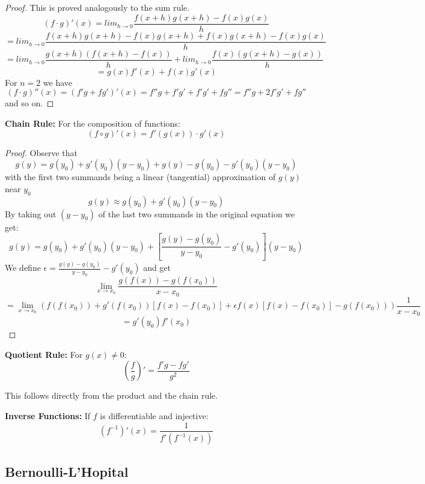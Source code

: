 \begin{proof}
    This is proved analogously to the sum rule.
    $$(f \cdot g)'(x) = lim_{h \to 0} \frac{f(x+h)g(x+h)-f(x)g(x)}{h}$$
    $$ = lim_{h \to 0} \frac{f(x+h)g(x+h)-f(x)g(x+h)+f(x)g(x+h)-f(x)g(x)}{h}$$
    $$ = lim_{h \to 0} \frac{g(x+h)(f(x+h)-f(x))}{h} + lim_{h \to 0} \frac{f(x)(g(x+h)-g(x))}{h}$$
    $$ = g(x)f'(x) + f(x)g'(x)$$
    For $n=2$ we have
    $$(f \cdot g)''(x) = (f'g+fg')'(x) = f''g+f'g'+f'g'+fg'' = f''g+2f'g'+fg''$$
    and so on.
\end{proof}

\begin{theorem}
    \textbf{Chain Rule:} For the composition of functions:
    $$(f \circ g)'(x) = f'(g(x)) \cdot g'(x) $$
\end{theorem}

\begin{proof}
    Observe that 
    $$g(y) = g(y_0) + g'(y_0)(y-y_0) + g(y)-g(y_0)-g'(y_0)(y-y_0)$$
    with the first two summands being a linear (tangential) approximation of $g(y)$ near $y_0$
    $$ g(y) \approx g(y_0) + g'(y_0)(y-y_0)$$ 
    By taking out $(y - y_0)$ of the last two summands in the original equation we get:
    $$g(y) = g(y_0) + g'(y_0)(y-y_0) + \left[\frac{g(y)-g(y_0)}{y-y_0}-g'(y_0)\right](y-y_0)$$
    We define $\epsilon = \frac{g(y)-g(y_0)}{y-y_0}-g'(y_0)$ and get
    $$\lim_{x \to x_0} \frac{g(f(x))-g(f(x_0))}{x-x_0}$$
    $$ = \lim_{x \to x_0} \left(f(f(x_0)) + g'(f(x_0))[f(x)-f(x_0)]+\epsilon f(x)[f(x)-f(x_0)] - g(f(x_0))\right) \frac{1}{x-x_0}$$
    $$ = g'(y_0)f'(x_0)$$
\end{proof}

\begin{theorem}
    \textbf{Quotient Rule:} For $g(x) \neq 0$:
    $$\left(\frac{f}{g}\right)' = \frac{f'g - fg'}{g^2} $$
\end{theorem}

\begin{remark}
    This follows directly from the product and the chain rule.
\end{remark}

\begin{theorem}
    \textbf{Inverse Functions:} If $f$ is differentiable and injective:
    $$(f^{-1})'(x) = \frac{1}{f'(f^{-1}(x))} $$
\end{theorem}

\subsection{Bernoulli-L'Hopital}


